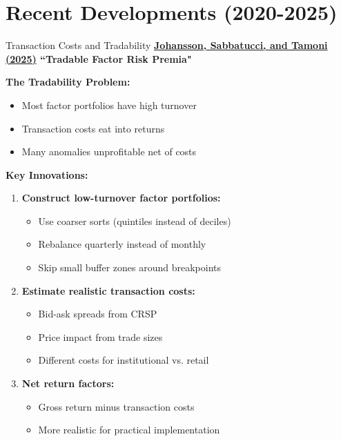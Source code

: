 \documentclass{beamer}
\begin{document}
\section{Recent Developments (2020-2025)}

\begin{frame}{Transaction Costs and Tradability}
    \textbf{\textcolor{blue}{\href{https://doi.org/10.1093/rof/rfae034}{Johansson, Sabbatucci, and Tamoni (2025)}} ``Tradable Factor Risk Premia"}
    
    
    \textbf{The Tradability Problem:}
    \begin{itemize}
        \item Most factor portfolios have high turnover
        \item Transaction costs eat into returns
        \item Many anomalies unprofitable net of costs
    \end{itemize}
    
    
    \textbf{Key Innovations:}
    \begin{enumerate}
        \item \textbf{Construct low-turnover factor portfolios:}
        \begin{itemize}
            \item Use coarser sorts (quintiles instead of deciles)
            \item Rebalance quarterly instead of monthly
            \item Skip small buffer zones around breakpoints
        \end{itemize}
        
        \item \textbf{Estimate realistic transaction costs:}
        \begin{itemize}
            \item Bid-ask spreads from CRSP
            \item Price impact from trade sizes
            \item Different costs for institutional vs. retail
        \end{itemize}
        
        \item \textbf{Net return factors:}
        \begin{itemize}
            \item Gross return minus transaction costs
            \item More realistic for practical implementation
        \end{itemize}
    \end{enumerate}
\end{frame}
\end{document}
